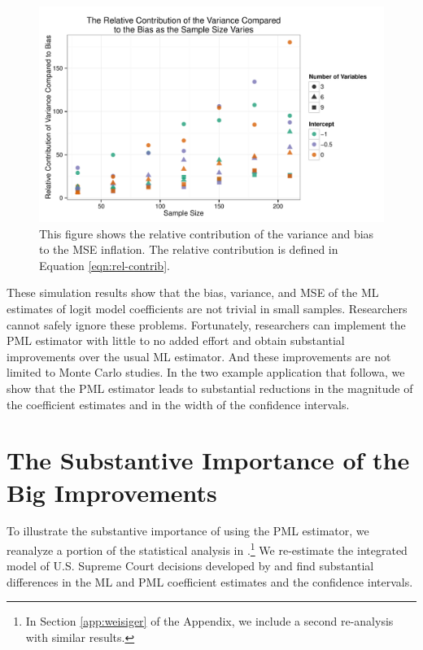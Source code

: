 \documentclass[12pt]{article}
\begin{document}
\begin{figure}[h]
\begin{center}
\includegraphics[scale = 0.7]{figs/relcontrib-n-scatter.pdf}
\caption{This figure shows the relative contribution of the variance and bias to the MSE inflation. The relative contribution is defined in Equation \ref{eqn:rel-contrib}.}\label{fig:relcontrib-n-scatter}
\end{center}
\end{figure}

These simulation results show that the bias, variance, and MSE of the ML estimates of logit model coefficients are not trivial in small samples.
Researchers cannot safely ignore these problems.
Fortunately, researchers can implement the PML estimator with little to no added effort and obtain substantial improvements over the usual ML estimator. 
And these improvements are not limited to Monte Carlo studies. 
In the two example application that followa, we show that the PML estimator leads to substantial reductions in the magnitude of the coefficient estimates and in the width of the confidence intervals.

\section*{The Substantive Importance of the Big Improvements}

To illustrate the substantive importance of using the PML estimator, we reanalyze a portion of the statistical analysis in \cite{GeorgeEpstein1992}.\footnote{In Section \ref{app:weisiger} of the Appendix, we include a second re-analysis with similar results.}
We re-estimate the integrated model of U.S. Supreme Court decisions developed by \cite{GeorgeEpstein1992} and find substantial differences in the ML and PML coefficient estimates and the confidence intervals.
\end{document}
